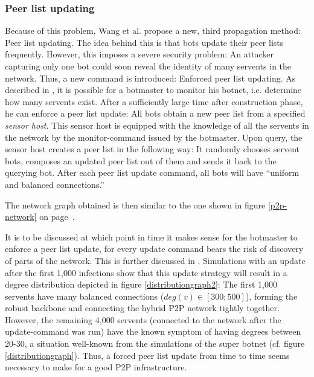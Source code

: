\documentclass{llncs}
\begin{document}
\subsubsection{Peer list updating}
Because of this problem, Wang et al. propose a new, third propagation
method: Peer list updating. The idea behind this is that bots update
their peer lists frequently. However, this imposes a severe security
problem: An attacker capturing only one bot could soon reveal the
identity of many servents in the network. Thus, a new command is
introduced: Enforced peer list updating. As described in \cite{td1sc},
it is possible for a botmaster to monitor his botnet, i.e. determine
how many servents exist. After a sufficiently large time after
construction phase, he can enforce a peer list update: All bots obtain
a new peer list from a specified {\it sensor host}. This sensor host
is equipped with the knowledge of all the servents in the network by
the monitor-command issued by the botmaster. Upon query, the sensor
host creates a peer list in the following way: It randomly chooses
servent bots, composes an updated peer list out of them and sends it
back to the querying bot. After each peer list update command, all
bots will have ``uniform and balanced connections.''\cite{td1sc}

The network graph obtained is then similar to the one shown in figure
\ref{p2p-network} on page~\pageref{p2p-network}.

It is to be discussed at which point in time it makes sense for the
botmaster to enforce a peer list update, for every update command
bears the risk of discovery of parts of the network. This is further
discussed in \cite{td1sc}. Simulations with an update after the first
1,000 infections show that this update strategy will result in a
degree distribution depicted in figure \ref{distributiongraph2}: The
first 1,000 servents have many balanced connections ($deg(v) \in
[300;500]$), forming the robust backbone and connecting the hybrid P2P
network tightly together. However, the remaining 4,000 servents
(connected to the network after the update-command was run) have the
known symptom of having degrees between 20-30, a situation well-known
from the simulations of the super botnet (cf. figure
\ref{distributiongraph}). Thus, a forced peer list update from time to
time seems necessary to make for a good P2P infrastructure.
\end{document}
